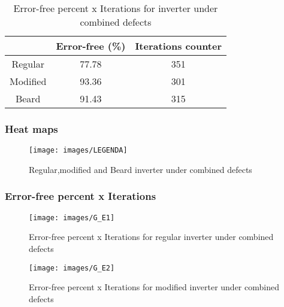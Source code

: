 \begin{table}[h]
\begin{center}
\begin{tabular}{|c|c|c|}
\hline
 & Error-free (\%) & Iterations counter \\
\hline
 Regular & 77.78 & 351 \\
\hline
 Modified & 93.36 & 301 \\
\hline
 Beard & 91.43 & 315 \\
\hline

\end{tabular}
\caption{Error-free percent x Iterations for inverter under combined defects}
\end{center}
\end{table}

\pagebreak
\subsubsection{Heat maps}

\begin{figure}[h]
\center
{}
\hfill
{}
\linebreak
\hfill
{}
\linebreak
{\texttt{[image: images/LEGENDA]}
}
\caption{Regular,modified and Beard inverter under combined defects}
\label{figure:inverter_t1}
\end{figure}

\subsubsection{Error-free percent x Iterations}

\begin{figure}[h!]
\center
\texttt{[image: images/G\_E1]}
\caption{Error-free percent x Iterations for regular inverter under combined defects}
\label{figure:inverter_reg_gt1}
\end{figure}

\begin{figure}[h!]
\center
\texttt{[image: images/G\_E2]}
\caption{Error-free percent x Iterations for modified inverter under combined defects}
\label{figure:inverter_mod1_gt1}
\end{figure}

